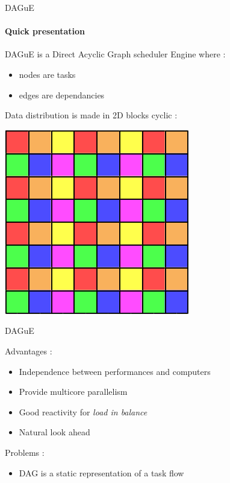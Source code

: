 \begin{frame}{DAGuE}
\framesubtitle{Quick presentation}
DAGuE is a Direct Acyclic Graph scheduler Engine where :
\begin{itemize}
\item nodes are tasks
\item edges are dependancies
\end{itemize}
Data distribution is made in 2D blocks cyclic :
\begin{center}
\includegraphics[scale=0.5]{scalapack.png}
\end{center}
\end{frame}

\begin{frame}{DAGuE}
\begin{exampleblock}{Advantages :}
\begin{itemize}
\item Independence between performances and computers
\item Provide multicore parallelism
\item Good reactivity for \textit{load in balance}
\item Natural look ahead
\end{itemize}
\end{exampleblock}{}
\pause
\begin{exampleblock}{Problems :}
\begin{itemize}
\item DAG is a static representation of a task flow
\end{itemize}
\end{exampleblock}{}
\end{frame}

